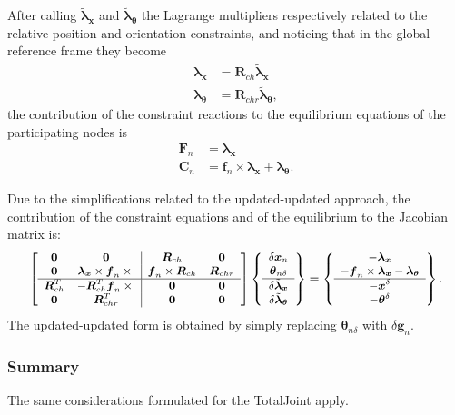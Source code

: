 \documentclass[10pt,dvips,fleqn,subeqn]{report}
\newcommand{\T}[1]{\boldsymbol{#1}}
\begin{document}
After calling $\tilde{\T{\lambda}}_{\T{x}}$
and $\tilde{\T{\lambda}}_{\T{\theta}}$ the Lagrange multipliers
respectively related to the relative position and orientation
constraints, and noticing that in the global reference frame
they become
\begin{align}
	\T{\lambda}_{\T{x}} &= \T{R}_{ch} \tilde{\T{\lambda}}_{\T{x}} \\
	\T{\lambda}_{\T{\theta}} &= \T{R}_{chr} \tilde{\T{\lambda}}_{\T{\theta}} ,
\end{align}
the contribution of the constraint reactions to the equilibrium equations
of the participating nodes is
\begin{align}
	\T{F}_n &= \T{\lambda}_{\T{x}} \\
	\T{C}_n &= \T{f}_n \times \T{\lambda}_{\T{x}} + \T{\lambda}_{\T{\theta}} .
\end{align}

Due to the simplifications related to the updated-updated approach,
the contribution of the constraint equations and of the equilibrium 
to the Jacobian matrix is: 
\begin{equation}
	\small
	\sqbr{\matr{cc|cc}{
	\T{0} &
	\T{0} &
	\T{R}_{ch} &
	\T{0} \\
	\T{0} &
	\T{\lambda}_{\T{x}}\times\T{f}_n\times{} &
	\T{f}_n\times\T{R}_{ch} & 
	\T{R}_{chr} \\
	\hline
	\T{R}_{ch}^T &
	-\T{R}_{ch}^T\T{f}_n\times{} & 
	\T{0} &
	\T{0} \\
	\T{0} &
	\T{R}_{chr}^T &
	\T{0} & 
	\T{0}
	}} \cubr{\cvvect{
		\delta\T{x}_n \\
		\T{\theta}_{n\delta} \\
		\hline
		\delta\tilde{\T{\lambda}}_{\T{x}} \\
		\delta\tilde{\T{\lambda}}_{\T{\theta}}
	}}
	= \cubr{\cvvect{
	- \T{\lambda}_{\T{x}} \\
	- \T{f}_n \times \T{\lambda}_{\T{x}} - \T{\lambda}_{\T{\theta}} \\
	\hline
	- \T{x}^{\delta} \\
	- \T{\theta}^{\delta}
	}} .
\end{equation}
The updated-updated form is obtained by simply replacing
$\T{\theta}_{n\delta}$ with $\delta\T{g}_n$.

\subsubsection{Summary}
The same considerations formulated for the TotalJoint apply.
\end{document}
